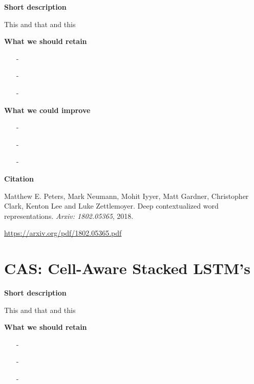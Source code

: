 \textbf{Short description}

This and that and this


\textbf{What we should retain}

\begin{enumerate}[topsep = 0pt, itemsep = 0pt]
    \item[-] 
    
    \item[-] 
    
    \item[-]
    
\end{enumerate}


\textbf{What we could improve}

\begin{enumerate}[topsep = 0pt, itemsep = 0pt]
    \item[-] 
    
    \item[-] 
    
    \item[-]
    
\end{enumerate}


\textbf{Citation}

Matthew E. Peters, Mark Neumann, Mohit Iyyer, Matt Gardner, Christopher Clark, Kenton Lee and Luke Zettlemoyer.
Deep contextualized word representations.
\textit{Arxiv: 1802.05365}, 2018.


\url{https://arxiv.org/pdf/1802.05365.pdf}



\newpage
\section{CAS: Cell-Aware Stacked LSTM's}


\textbf{Short description}

This and that and this


\textbf{What we should retain}

\begin{enumerate}[topsep = 0pt, itemsep = 0pt]
    \item[-] 
    
    \item[-] 
    
    \item[-]
    
\end{enumerate}


